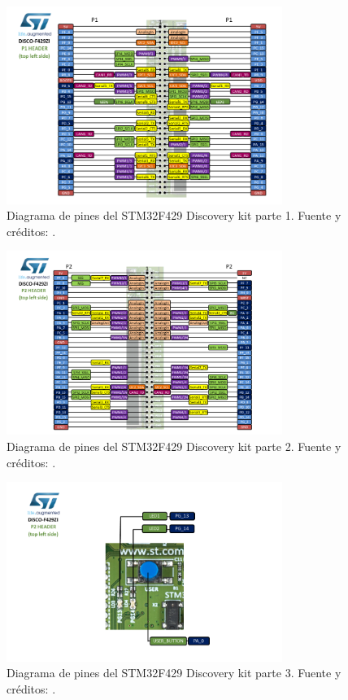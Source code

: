 \begin{figure}[H]
\centering
\includegraphics[width=0.8\textwidth]{Imagenes/Diagrama_Pines1.png} 
\caption{Diagrama de pines del STM32F429 Discovery kit parte 1. Fuente y créditos: \cite{st-discovery-f429zi}.}
\label{Fig: Diagrama_pines1}
\end{figure}

\begin{figure}[H]
\centering
\includegraphics[width=0.8\textwidth]{Imagenes/Diagrama_Pines2.png} 
\caption{Diagrama de pines del STM32F429 Discovery kit parte 2. Fuente y créditos: \cite{st-discovery-f429zi}.}
\label{Fig: Diagrama_pines2}
\end{figure}

\begin{figure}[H]
\centering
\includegraphics[width=0.8\textwidth]{Imagenes/Diagrama_Pines3.png} 
\caption{Diagrama de pines del STM32F429 Discovery kit parte 3. Fuente y créditos: \cite{st-discovery-f429zi}.}
\label{Fig: Diagrama_pines3}
\end{figure}

